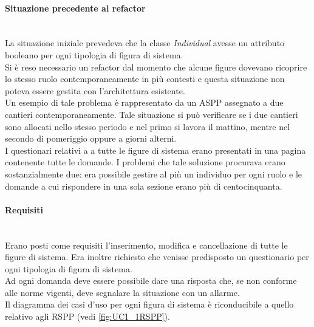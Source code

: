 	\paragraph*{Situazione precedente al refactor} \mbox{} \\
	
	La situazione iniziale prevedeva che la classe \textit{Individual} avesse  un attributo booleano per ogni tipologia di figura di sistema. \\
	Si è reso necessario un refactor dal momento che alcune figure dovevano ricoprire lo stesso ruolo contemporaneamente in più contesti e questa situazione non poteva essere gestita con l'architettura esistente. \\
	Un esempio di tale problema è rappresentato da un ASPP assegnato a due cantieri contemporaneamente. Tale situazione si può verificare se i due cantieri sono allocati nello stesso periodo e nel primo si lavora il mattino, mentre nel secondo di pomeriggio oppure a giorni alterni.\\
	I questionari relativi a a tutte le figure di sistema erano presentati in una pagina contenente tutte le domande. I problemi che tale soluzione procurava erano sostanzialmente due: era possibile gestire al più un individuo per ogni ruolo e le domande a cui rispondere in una sola sezione erano più di centocinquanta.
	
	\paragraph*{Requisiti}\mbox{} \\
	Erano posti come requisiti l'inserimento, modifica e cancellazione di tutte le figure di sistema. Era inoltre richiesto che venisse predisposto un questionario per ogni tipologia di figura di sistema. \\
	Ad ogni domanda deve essere possibile dare una risposta che, se non conforme alle norme vigenti, deve segnalare la situazione con un allarme.\\
	Il diagramma dei casi d'uso per ogni figura di sistema è riconducibile a quello relativo agli RSPP (vedi  \autoref{fig:UC1_1RSPP}).


